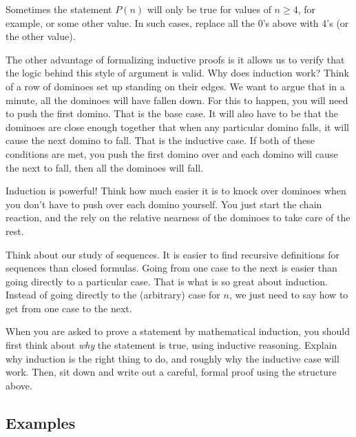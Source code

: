 \documentclass[10pt,]{book}
\theoremstyle{plain}
\theoremstyle{definition}
\theoremstyle{definition}
\theoremstyle{definition}
\numberwithin{equation}{chapter}
\begin{document}
Sometimes the statement \(P(n)\) will only be true for values of \(n \ge 4\), for example, or some other value. In such cases, replace all the 0's above with 4's (or the other value).
%
\par

The other advantage of formalizing inductive proofs is it allows us to verify that the logic behind this style of argument is valid. Why does induction work? Think of a row of dominoes set up standing on their edges. We want to argue that in a minute, all the dominoes will have fallen down. For this to happen, you will need to push the first domino. That is the base case. It will also have to be that the dominoes are close enough together that when any particular domino falls, it will cause the next domino to fall. That is the inductive case. If both of these conditions are met, you push the first domino over and each domino will cause the next to fall, then all the dominoes will fall.
%
\par

Induction is powerful! Think how much easier it is to knock over dominoes when you don't have to push over each domino yourself. You just start the chain reaction, and the rely on the relative nearness of the dominoes to take care of the rest.
%
\par

Think about our study of sequences. It is easier to find recursive definitions for sequences than closed formulas. Going from one case to the next is easier than going directly to a particular case. That is what is so great about induction. Instead of going directly to the (arbitrary) case for \(n\), we just need to say how to get from one case to the next.
%
\par

When you are asked to prove a statement by mathematical induction, you should first think about \emph{why} the statement is true, using inductive reasoning. Explain why induction is the right thing to do, and roughly why the inductive case will work. Then, sit down and write out a careful, formal proof using the structure above.
%
\typeout{************************************************}
\typeout{************************************************}
\subsection[Examples]{Examples}\label{subsec_induction-examples}
\typeout{************************************************}
\typeout{************************************************}
\end{document}
